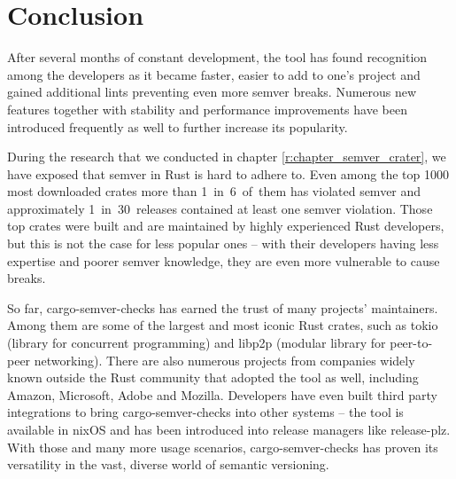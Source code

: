 \documentclass[licencjacka,en]{pracamgr}
\begin{document}
\chapter{Conclusion}\label{r:chapter_conclusion}

After several months of constant development, the tool has found recognition among the developers
as it became faster, easier to add to one's project and gained additional lints preventing
even more semver breaks. Numerous new features together with stability and performance improvements
have been introduced frequently as well to further increase its popularity.

During the research that we conducted in chapter \ref{r:chapter_semver_crater},
we have exposed that semver in Rust is hard to adhere to. Even among the top 1000 most downloaded
crates more than \mbox{1 in 6 of them} has violated semver and approximately
\mbox{1 in 30 releases} contained at least one semver violation. Those top crates were built and
are maintained by highly experienced Rust developers, but this is not the case for less popular
ones -- with their developers having less expertise and poorer semver knowledge, they are even more
vulnerable to cause breaks.

So far, cargo-semver-checks has earned the trust of many projects' maintainers. Among them are some
of the largest and most iconic Rust crates, such as tokio (library for concurrent programming)
and libp2p (modular library for peer-to-peer networking). There are also numerous projects from
companies widely known outside the Rust community that adopted the tool as well, including Amazon,
Microsoft, Adobe and Mozilla. Developers have even built third party integrations to bring
cargo-semver-checks into other systems -- the tool is available in nixOS and has been introduced
into release managers like release-plz. With those and many more usage scenarios,
cargo-semver-checks has proven its versatility in the vast, diverse world of semantic versioning.
\end{document}
